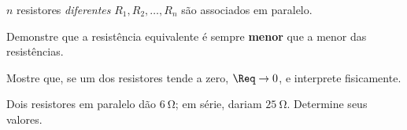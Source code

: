 \blocodesafio
\begin{questao}[4]{}

$n$ resistores \emph{diferentes} $R_1, R_2, \dots, R_n$ são associados em
paralelo.
\begin{itensq}
\item Demonstre que a resistência equivalente é sempre \textbf{menor} que a menor
      das resistências.
\item Mostre que, se um dos resistores tende a zero, $\Req \to 0$, e interprete
      fisicamente.
\item Dois resistores em paralelo dão $\SI{6}{\ohm}$; em série, dariam
      $\SI{25}{\ohm}$. Determine seus valores.
\end{itensq}


\end{questao}

